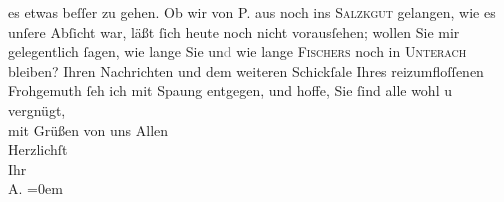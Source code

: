 \begin{ledgroupsized}[t]{13cm}
               es etwas beſſer zu gehen. Ob wir von P. aus noch
               ins \textsc{Salzkgut} gelangen, wie es unſere Abſicht war, läßt ſich heute noch nicht voraus{\pb}ſehen; wollen Sie mir gelegentlich ſagen, wie
               lange Sie un\textcolor{gray}{d} wie lange \textsc{Fischers} noch in \textsc{Unterach} bleiben? \pend
           \pstart
           Ihren Nachrichten und dem weiteren Schickſale Ihres reizumfloſſenen Frohgemuth ſeh ich mit Spa{\geminationn}ung entgegen, und hoffe, Sie ſind alle wohl u vergnügt,
               {\\[\baselineskip]}mit Grüßen von uns Allen {\\[\baselineskip]}Herzlichſt {\\[\baselineskip]}Ihr {\\[\baselineskip]}\spacefill\mbox{A.}\pend
           \leftskip=0em{}
         
         \endnumbering{}\end{ledgroupsized}\begin{anhang}\end{anhang}\newcommand{\dateiname}{L03018}\newcommand{\titel}{Arthur Schnitzler an Felix Salten, 8. 8. 1911}\newcommand{\editorInnen}{Martin Anton Müller und Laura Untner}
      